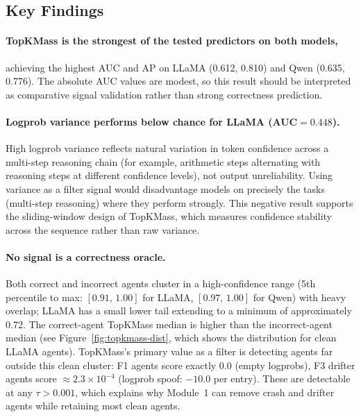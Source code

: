 \documentclass[11pt]{article}
\begin{document}
\subsection{Key Findings}
\label{sec:exp2-findings}

\paragraph{TopKMass is the strongest of the tested predictors on both models,}
achieving the highest AUC and AP on LLaMA (0.612, 0.810) and Qwen (0.635,
0.776). The absolute AUC values are modest, so this result should be interpreted
as comparative signal validation rather than strong correctness prediction.

\paragraph{Logprob variance performs below chance for LLaMA (AUC$=0.448$).}
High logprob variance reflects natural variation in token confidence across a
multi-step reasoning chain (for example, arithmetic steps alternating with
reasoning steps at different confidence levels), not output unreliability. Using
variance as a filter signal would disadvantage models on precisely the tasks
(multi-step reasoning) where they perform strongly. This negative result
supports the sliding-window design of TopKMass, which measures confidence
stability across the sequence rather than raw variance.

\paragraph{No signal is a correctness oracle.}
Both correct and incorrect agents cluster in a high-confidence range
(5th percentile to max: $[0.91,\,1.00]$ for LLaMA, $[0.97,\,1.00]$ for Qwen)
with heavy overlap; LLaMA has a small lower tail extending to a minimum of
approximately 0.72. The
correct-agent TopKMass median is higher than the incorrect-agent median (see
Figure~\ref{fig:topkmass-dist}, which shows the distribution for clean LLaMA
agents). TopKMass's primary value as a
filter is detecting agents far outside this clean cluster: F1 agents score
exactly 0.0 (empty logprobs), F3 drifter agents score ${\approx}2.3\times10^{-4}$
(logprob spoof: $-10.0$ per entry). These are detectable at any $\tau > 0.001$,
which explains why Module~1 can remove crash and drifter agents while retaining
most clean agents.
\end{document}
